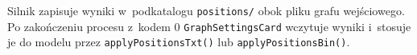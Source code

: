 \documentclass[12pt]{article}
\begin{document}
Silnik zapisuje wyniki w~podkatalogu \texttt{positions/} obok pliku grafu
wejściowego. Po zakończeniu procesu z~kodem 0 \texttt{GraphSettingsCard}
wczytuje wyniki i~stosuje je do modelu przez \texttt{applyPositionsTxt()}
lub \texttt{applyPositionsBin()}.

\end{document}
